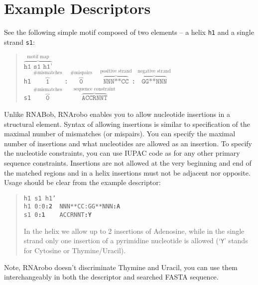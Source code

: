 \documentclass[11pt]{article}
\begin{document}
\section*{Example Descriptors}
See the following simple motif composed of two elements -- a helix \texttt{h1} and a single strand \texttt{s1}:
\begin{quote}
$\overbrace{\texttt{h1 s1 h1'}}^{\text{motif map}}$\\
\texttt{h1} $\overbrace{\texttt{1}}^{\text{\# mismatches}}$ \texttt{:} $\overbrace{\texttt{0}}^{\text{\# mispairs}}$ ~
$\overbrace{\texttt{NNN**CC}}^{\text{positive strand}}$\texttt{:}
$\overbrace{\texttt{GG**NNN}}^{\text{negative strand}}$ \\

\texttt{s1} $\overbrace{\texttt{0}}^{\text{\# mismatches}}$ ~~
$\overbrace{\texttt{ACCRNNT}}^{\text{sequence constraint}}$

\end{quote}

Unlike RNABob, RNArobo enables you to allow nucleotide insertions in a structural element. Syntax of allowing insertions is similar to specification of the maximal number of mismatches (or mispairs). You can specify the maximal number of insertions and what nucleotides are allowed as an insertion. To specify the nucleotide constraints, you can use IUPAC code as for any other primary sequence constraints.  Insertions are not allowed at the very beginning and end of the matched regions and in a helix insertions must not be adjacent nor opposite. Usage should be clear from the example descriptor:

\begin{quote}
\texttt{h1 s1 h1'}\\
\texttt{h1 0:0\textbf{:2} ~NNN**CC:GG**NNN\textbf{:A}}\\
\texttt{s1 0\textbf{:1} ~~~ACCRNNT\textbf{:Y}}

In the helix we allow up to 2 insertions of Adenosine, while in the single strand only one insertion of a pyrimidine nucleotide is allowed (`\texttt{Y}' stands for Cytosine or Thymine/Uracil). 
\end{quote}

Note, RNArobo doesn't discriminate Thymine and Uracil, you can use them interchangeably in both the descriptor and searched FASTA sequence.
\end{document}
